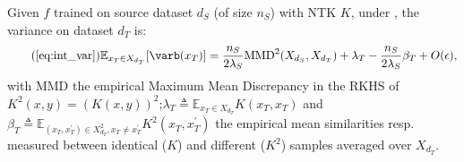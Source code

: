 \begin{proposition*}[\ref{prop:var}]
    Given $f$ trained on source dataset $d_S$ (of size $n_S$) with NTK $K$, under , the variance on dataset $d_T$ is:%
    \begin{equation*} \tag{\ref{eq:int_var}}
        \mathbb{E}_{x_T\in X_{d_T}}[\varb(x_T)] = \frac{n_S}{2\lambda_S}\text{MMD}^{2}(X_{d_S}, X_{d_T}) + \lambda_T - \frac{n_S}{2\lambda_S}\beta_T + O(\epsilon),%
    \end{equation*}
    with $\text{MMD}$ the empirical Maximum Mean Discrepancy in the RKHS of $K^2(x,y)=(K(x,y))^2$;$\lambda_T \triangleq \mathbb{E}_{x_T \in X_{d_T}} K\left(x_T, x_T\right)$ and $\beta_T \triangleq \mathbb{E}_{(x_T,x_T^\prime)\in X_{d_T}^2, x_T \neq x_T^\prime} K^2\left(x_T, x_T^{\prime}\right)$ the empirical mean similarities resp. measured between identical (\wrt $K$) and different (\wrt $K^2$) samples averaged over $X_{d_T}$.%
\end{proposition*}
